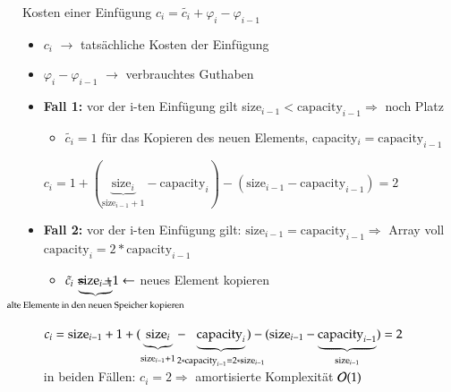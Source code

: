 Kosten einer Einfügung $c_i = \tilde{c_i} + \varphi_i - \varphi_{i-1}$\\
\begin{itemize}
    \item $c_i$ $\rightarrow$ tatsächliche Kosten der Einfügung
    \item $ \varphi_i - \varphi_{i-1}$ $\rightarrow$ verbrauchtes Guthaben
\end{itemize}

\begin{itemize}
    \item \textbf{Fall 1:} vor der i-ten Einfügung gilt size$_{i-1} < \text{capacity}_{i-1} \Rightarrow$ noch Platz
    \begin{itemize}[label={$\Rightarrow$}]
        \item $\tilde{c_i} = 1$ für das Kopieren des neuen Elements, capacity$_i = \text{capacity}_{i-1}$
    \end{itemize}
    $c_i = 1 + (\underbrace{\text{size}_i}_{\text{size}_{i-1}+1}- \text{capacity}_i) - (\text{size}_{i-1} - \text{capacity}_{i-1}) = 2$

    \item \textbf{Fall 2:} vor der i-ten Einfügung gilt: $\text{size}_{i-1} = \text{capacity}_{i-1} \Rightarrow $ Array voll \\
    \hspace*{7.8cm}  $\text{capacity}_{i} = 2*\text{capacity}_{i-1} $ \\
    \begin{itemize}[label={$\Rightarrow$}]
        \item   $\tilde{c_i} = \hspace*{-2.3cm}\underbrace{\text{size}_{i-1}}_{\text{alte Elemente in den neuen Speicher kopieren}}\hspace*{-2.3cm}+  1 \leftarrow$ neues Element kopieren
    \end{itemize}
    $c_i = \text{size}_{i-1} + 1 + (\underbrace{\text{size}_{i}}_{\text{size}_{i-1}+1} - \hspace*{-0.3cm} \underbrace{\text{capacity}_{i}}_{2*\text{capacity}_{i-1} = 2* \text{size}_{i-1}}\hspace*{-0.5cm}) - (\text{size}_{i-1} -\underbrace{ \text{capacity}_{i-1}}_{\text{size}_{i-1}}) = 2$ \\

    in beiden Fällen: $c_i = 2 \Rightarrow$ amortisierte Komplexität $\mathcal{O}{}(1)$
\end{itemize}

